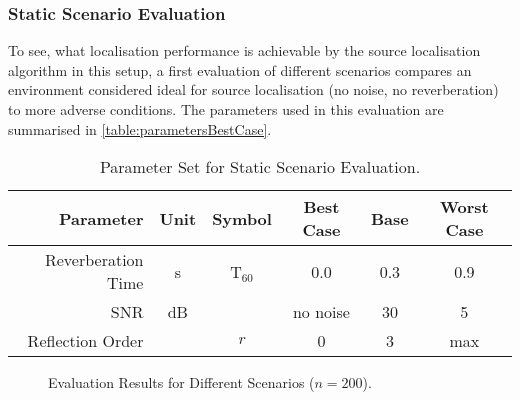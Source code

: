 \subsubsection{Static Scenario Evaluation}
\label{sec:ScenarioEvalStatic}

To see, what localisation performance is achievable by the source localisation algorithm in this setup, a first evaluation of different scenarios compares an environment considered ideal for source localisation (no noise, no reverberation) to more adverse conditions. The parameters used in this evaluation are summarised in \autoref{table:parametersBestCase}.

\begin{table}[!hbt]
	\begin{tabular}{rccccc}
		\toprule
		Parameter          & Unit & Symbol   & Best Case & Base     & Worst Case \\
		\midrule
		Reverberation Time & s    & T$_{60}$ & 0.0       & 0.3      & 0.9        \\
		SNR                & dB   &          & no noise  & 30       & 5          \\
		Reflection Order   &      & $r$      & 0         & 3        & max        \\
		\bottomrule
	\end{tabular}
	\caption[Parameter Set for Static Scenario Evaluation]{Parameter Set for Static Scenario Evaluation.}
	\label{table:parametersBestCase}
\end{table}

\begin{figure}[H]
	\iftoggle{quick}{%
		\texttt{[image: plots/boxplots/boxplot-joined-best-case]}
	}{%
		
	}
	\caption[Evaluation Results for Different Scenarios]{Evaluation Results for Different Scenarios ($n=200$).}
	\label{fig:trialCases}
\end{figure}

